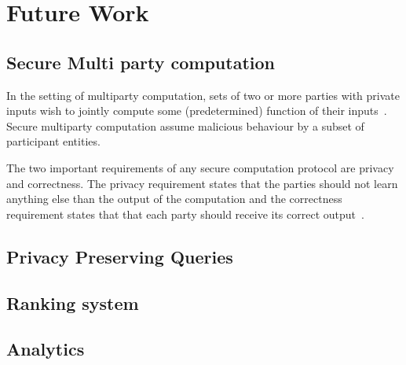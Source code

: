\chapter{Future Work}
\label{future_work}

\section{Secure Multi party computation}
\label{future_work:mpc}

In the setting of multiparty computation, sets of two or more parties with private inputs wish to jointly compute some (predetermined) function of their inputs~\cite{mpc}. Secure multiparty computation assume malicious behaviour by a subset of participant entities.

The two important requirements of any secure computation protocol are privacy and correctness. The privacy requirement states that the parties should not learn anything else than the output of the computation and the correctness requirement states that that each party should receive its correct output~\cite{mpc}.

\section{Privacy Preserving Queries}
\label{future_work:ppq}

\section{Ranking system}
\label{future_work:ranking_system}

\section{Analytics}
\label{future_work:analytics}
